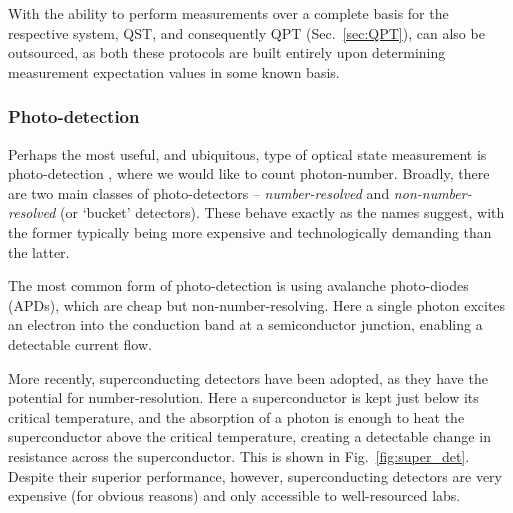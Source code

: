 \documentclass[aps,rmp,twocolumn,amsmath,amssymb,nofootinbib,superscriptaddress,longbibliography,floatfix,table-of-contents,eqsecnum]{revtex4-1}
\begin{document}
With the ability to perform measurements over a complete basis for the respective system, QST, and consequently QPT (Sec.~\ref{sec:QPT}), can also be outsourced, as both these protocols are built entirely upon determining measurement expectation values in some known basis.

%
%

\subsubsection{Photo-detection} \label{sec:photo_detection} 

Perhaps the most useful, and ubiquitous, type of optical state measurement is photo-detection \cite{RohdePDReview}, where we would like to count photon-number. Broadly, there are two main classes of photo-detectors -- \textit{number-resolved} and \textit{non-number-resolved} (or `bucket' detectors). These behave exactly as the names suggest, with the former typically being more expensive and technologically demanding than the latter.

The most common form of photo-detection is using avalanche photo-diodes (APDs), which are cheap but non-number-resolving. Here a single photon excites an electron into the conduction band at a semiconductor junction, enabling a detectable current flow.

More recently, superconducting detectors have been adopted, as they have the potential for number-resolution. Here a superconductor is kept just below its critical temperature, and the absorption of a photon is enough to heat the superconductor above the critical temperature, creating a detectable change in resistance across the superconductor. This is shown in Fig.~\ref{fig:super_det}. Despite their superior performance, however, superconducting detectors are very expensive (for obvious reasons) and only accessible to well-resourced labs.
\end{document}
